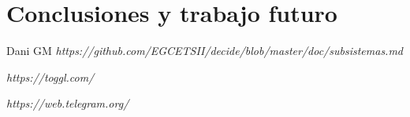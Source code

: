 \documentclass[12pt]{article}
\begin{document}
\section{Conclusiones y trabajo futuro}

\newpage	


\begin{thebibliography}{9}
Dani GM
\textit
{https://github.com/EGCETSII/decide/blob/master/doc/subsistemas.md}

\textit{https://toggl.com/}

\textit{https://web.telegram.org/}

\end{thebibliography}
\end{document}
